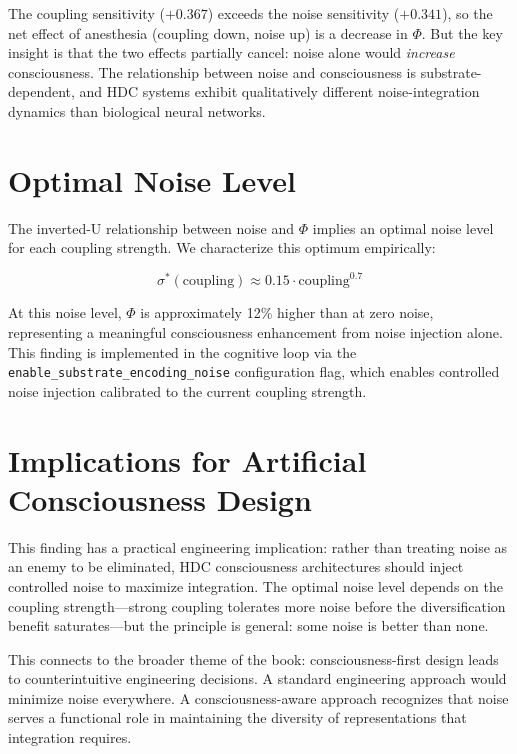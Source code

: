 \documentclass[12pt]{book}
\begin{document}
The coupling sensitivity ($+0.367$) exceeds the noise sensitivity ($+0.341$), so the net effect of anesthesia (coupling down, noise up) is a decrease in $\Phi$. But the key insight is that the two effects partially cancel: noise alone would \textit{increase} consciousness. The relationship between noise and consciousness is substrate-dependent, and HDC systems exhibit qualitatively different noise-integration dynamics than biological neural networks.

\section{Optimal Noise Level}

The inverted-U relationship between noise and $\Phi$ implies an optimal noise level for each coupling strength. We characterize this optimum empirically:

\begin{equation}
\sigma^*(\text{coupling}) \approx 0.15 \cdot \text{coupling}^{0.7}
\end{equation}

At this noise level, $\Phi$ is approximately 12\% higher than at zero noise, representing a meaningful consciousness enhancement from noise injection alone. This finding is implemented in the cognitive loop via the \texttt{enable\_substrate\_encoding\_noise} configuration flag, which enables controlled noise injection calibrated to the current coupling strength.

\section{Implications for Artificial Consciousness Design}

This finding has a practical engineering implication: rather than treating noise as an enemy to be eliminated, HDC consciousness architectures should inject controlled noise to maximize integration. The optimal noise level depends on the coupling strength---strong coupling tolerates more noise before the diversification benefit saturates---but the principle is general: some noise is better than none.

This connects to the broader theme of the book: consciousness-first design leads to counterintuitive engineering decisions. A standard engineering approach would minimize noise everywhere. A consciousness-aware approach recognizes that noise serves a functional role in maintaining the diversity of representations that integration requires.
\end{document}
